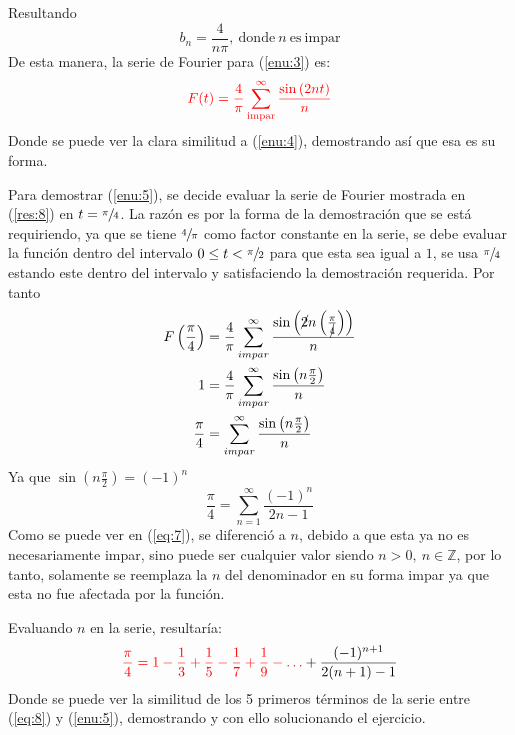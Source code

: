 \begin{multicols}{2}
Resultando
\begin{equation}
    b_n = \frac{4}{n\pi},~\mathrm{donde}~n~\mathrm{es~impar}
    \label{res:7}
\end{equation}
De esta manera, la serie de Fourier para (\ref{enu:3}) es:
\begin{equation}
    \textcolor{rojo}{F(t) = \frac{4}{\pi} \sum_{\mathrm{impar}}^{\infty} \frac{\sin\left(2nt\right)}{n}}
    \label{res:8}
\end{equation}
Donde se puede ver la clara similitud a (\ref{enu:4}), demostrando así que esa es su forma.

Para demostrar (\ref{enu:5}), se decide evaluar la serie de Fourier mostrada en (\ref{res:8}) en $t = \sfrac{\pi}{4}$. La razón es por la forma de la demostración que se está requiriendo, ya que se tiene $\sfrac{4}{\pi}$ como factor constante en la serie, se debe evaluar la función dentro del intervalo $0 \leq t < \sfrac{\pi}{2}$ para que esta sea igual a $1$, se usa $\sfrac{\pi}{4}$ estando este dentro del intervalo y satisfaciendo la demostración requerida. Por tanto
\begin{align*}
    F\left(\frac{\pi}{4}\right) &= \frac{4}{\pi} \sum_{impar}^{\infty} \frac{\sin\left(\cancel{2}n\left(\frac{\pi}{\cancel{4}}\right)\right)}{n}\\
    1 &= \frac{4}{\pi} \sum_{impar}^{\infty} \frac{\sin\left(n\frac{\pi}{2}\right)}{n}\\
    \frac{\pi}{4} &= \sum_{impar}^{\infty} \frac{\sin\left(n\frac{\pi}{2}\right)}{n}
\end{align*}
Ya que $\sin\left(n\frac{\pi}{2}\right) = \left(-1\right)^{n}$
\begin{equation}
    \frac{\pi}{4} = \sum_{n = 1}^{\infty} \frac{\left(-1\right)^{n}}{2n-1}
    \label{eq:7}
\end{equation}
Como se puede ver en (\ref{eq:7}), se diferenció a $n$, debido a que esta ya no es necesariamente impar, sino puede ser cualquier valor siendo $n > 0,~n\in \mathbb{Z}$, por lo tanto, solamente se reemplaza la $n$ del denominador en su forma impar ya que esta no fue afectada por la función.

Evaluando $n$ en la serie, resultaría:
\begin{equation}
    \textcolor{rojo}{\frac{\pi}{4} = 1 - \frac{1}{3} + \frac{1}{5} - \frac{1}{7} + \frac{1}{9} - \hdots} + \frac{(-1)^{n+1}}{2(n+1) - 1}
    \label{eq:8}
\end{equation}
Donde se puede ver la similitud de los 5 primeros términos de la serie entre (\ref{eq:8}) y (\ref{enu:5}), demostrando y con ello solucionando el ejercicio.


\end{multicols}
